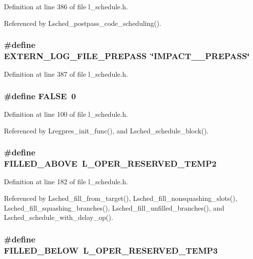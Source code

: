 Definition at line 386 of file l\_\-schedule.h.

Referenced by Lsched\_\-postpass\_\-code\_\-scheduling().
\subsubsection{\setlength{\rightskip}{0pt plus 5cm}\#define EXTERN\_\-LOG\_\-FILE\_\-PREPASS~\char`\"{}IMPACT\_\_\-PREPASS\char`\"{}}\label{l__schedule_8h_635c5f78625a3542169478e9f6e53c03}




Definition at line 387 of file l\_\-schedule.h.
\subsubsection{\setlength{\rightskip}{0pt plus 5cm}\#define \bf{FALSE}~0}\label{l__schedule_8h_a93f0eb578d23995850d61f7d61c55c1}




Definition at line 100 of file l\_\-schedule.h.

Referenced by Lregpres\_\-init\_\-func(), and Lsched\_\-schedule\_\-block().
\subsubsection{\setlength{\rightskip}{0pt plus 5cm}\#define FILLED\_\-ABOVE~L\_\-OPER\_\-RESERVED\_\-TEMP2}\label{l__schedule_8h_70d31d79e902bf3c29f60056750ba89d}




Definition at line 182 of file l\_\-schedule.h.

Referenced by Lsched\_\-fill\_\-from\_\-target(), Lsched\_\-fill\_\-nonsquashing\_\-slots(), Lsched\_\-fill\_\-squashing\_\-branches(), Lsched\_\-fill\_\-unfilled\_\-branches(), and Lsched\_\-schedule\_\-with\_\-delay\_\-op().
\subsubsection{\setlength{\rightskip}{0pt plus 5cm}\#define FILLED\_\-BELOW~L\_\-OPER\_\-RESERVED\_\-TEMP3}\label{l__schedule_8h_e2248cdf40679f28b0ffbb6ba4e6d957}




